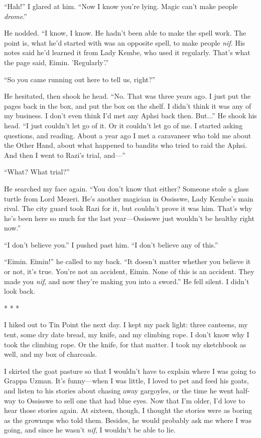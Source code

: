 ``Hah!''  I glared at him.  ``Now I know you're lying.  Magic can't make
people \emph{drome}.''

He nodded.  ``I know, I know.  He hadn't been able to make the spell
work.  The point is, what he'd started with was an opposite spell, to
make people \emph{nif}.  His notes said he'd learned it from Lady Kembe,
who used it regularly.  That's what the page said, Eimin.
'Regularly'.''

``So you came running out here to tell us, right?''

He hesitated, then shook he head.  ``No.  That was three years ago.  I
just put the pages back in the box, and put the box on the shelf.  I
didn't think it was any of my business.  I don't even think I'd met
any Aphsi back then.  But...''  He shook his head.  ``I just couldn't
let go of it.  Or it couldn't let go of me.  I started asking
questions, and reading.  About a year ago I met a caravaneer who told
me about the Other Hand, about what happened to bandits who tried to
raid the Aphsi.  And then I went to Razi's trial, and---''

``What?  What trial?''

He searched my face again.  ``You don't know that either?  Someone
stole a glass turtle from Lord Mezeri.  He's another magician in
Ossisswe, Lady Kembe's main rival.  The city guard took Razi for it,
but couldn't prove it was him.  That's why he's been here so much for
the last year---Ossisswe just wouldn't be healthy right now.''

``I don't believe you.''  I pushed past him.  ``I don't believe any of
this.''

``Eimin.  Eimin!''  he called to my back.  ``It doesn't matter whether
you believe it or not, it's true.  You're not an accident, Eimin.
None of this is an accident.  They made you \emph{nif}, and now they're
making you into a sword.''  He fell silent.  I didn't look back.

\begin{center}* * *\end{center}

I hiked out to Tin Point the next day.  I kept my pack light: three
canteens, my tent, some dry date bread, my knife, and my climbing
rope.  I don't know why I took the climbing rope.  Or the knife, for
that matter.  I took my sketchbook as well, and my box of charcoals.

I skirted the goat pasture so that I wouldn't have to explain where I
was going to Grappa Uzman.  It's funny---when I was little, I loved to
pet and feed his goats, and listen to his stories about chasing away
gargoyles, or the time he went half-way to Ossisswe to sell one that
had blue eyes.  Now that I'm older, I'd love to hear those stories
again.  At sixteen, though, I thought the stories were as boring as
the grownups who told them.  Besides, he would probably ask me where I
was going, and since he wasn't \emph{nif}, I wouldn't be able to lie.

